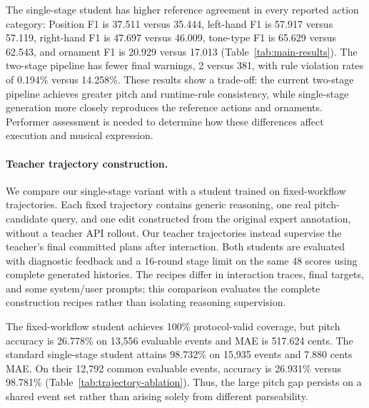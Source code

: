 The single-stage student has higher reference agreement in every reported action category: Position F1 is 37.511 versus 35.444, left-hand F1 is 57.917 versus 57.119, right-hand F1 is 47.697 versus 46.009, tone-type F1 is 65.629 versus 62.543, and ornament F1 is 20.929 versus 17.013 (Table~\ref{tab:main-results}). The two-stage pipeline has fewer final warnings, 2 versus 381, with rule violation rates of 0.194\% versus 14.258\%. These results show a trade-off: the current two-stage pipeline achieves greater pitch and runtime-rule consistency, while single-stage generation more closely reproduces the reference actions and ornaments. Performer assessment is needed to determine how these differences affect execution and musical expression.

\paragraph{Teacher trajectory construction.}
We compare our single-stage variant with a student trained on fixed-workflow trajectories. Each fixed trajectory contains generic reasoning, one real pitch-candidate query, and one edit constructed from the original expert annotation, without a teacher API rollout. Our teacher trajectories instead supervise the teacher's final committed plans after interaction. Both students are evaluated with diagnostic feedback and a 16-round stage limit on the same 48 scores using complete generated histories. The recipes differ in interaction traces, final targets, and some system/user prompts; this comparison evaluates the complete construction recipes rather than isolating reasoning supervision.

The fixed-workflow student achieves 100\% protocol-valid coverage, but pitch accuracy is 26.778\% on 13,556 evaluable events and MAE is 517.624 cents. The standard single-stage student attains 98.732\% on 15,935 events and 7.880 cents MAE. On their 12,792 common evaluable events, accuracy is 26.931\% versus 98.781\% (Table~\ref{tab:trajectory-ablation}). Thus, the large pitch gap persists on a shared event set rather than arising solely from different parseability.

